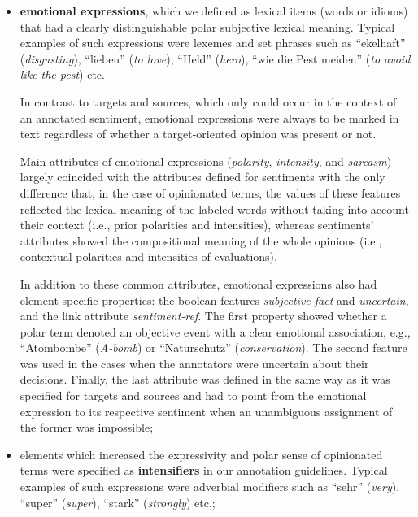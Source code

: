 \begin{itemize}
\item
  \textbf{emotional expressions}, which we defined as lexical items
  (words or idioms) that had a clearly distinguishable polar
  subjective lexical meaning.  Typical examples of such expressions
  were lexemes and set phrases such as ``ekelhaft''
  (\emph{disgusting}), ``lieben'' (\emph{to love}), ``Held''
  (\emph{hero}), ``wie die Pest meiden'' (\emph{to avoid like the
    pest}) etc.

  In contrast to targets and sources, which only could occur in the
  context of an annotated sentiment, emotional expressions were always
  to be marked in text regardless of whether a target-oriented opinion
  was present or not.

  Main attributes of emotional expressions (\emph{polarity},
  \emph{intensity}, and \emph{sarcasm}) largely coincided with the
  attributes defined for sentiments with the only difference that, in
  the case of opinionated terms, the values of these features
  reflected the lexical meaning of the labeled words without taking
  into account their context (i.e., prior polarities and intensities),
  whereas sentiments' attributes showed the compositional meaning of
  the whole opinions (i.e., contextual polarities and intensities of
  evaluations).

  In addition to these common attributes, emotional expressions also
  had element-specific properties: the boolean features
  \emph{subjective-fact} and \emph{uncertain}, and the link attribute
  \emph{sentiment-ref}.  The first property showed whether a polar
  term denoted an objective event with a clear emotional association,
  e.g., ``Atombombe'' (\emph{A-bomb}) or ``Naturschutz''
  (\emph{conservation}).  The second feature was used in the cases
  when the annotators were uncertain about their decisions.  Finally,
  the last attribute was defined in the same way as it was specified
  for targets and sources and had to point from the emotional
  expression to its respective sentiment when an unambiguous
  assignment of the former was impossible;

\item
  elements which increased the expressivity and polar sense of
  opinionated terms were specified as \textbf{intensifiers} in our
  annotation guidelines.  Typical examples of such expressions were
  adverbial modifiers such as ``sehr'' (\emph{very}), ``super''
  (\emph{super}), ``stark'' (\emph{strongly}) etc.;


\end{itemize}
